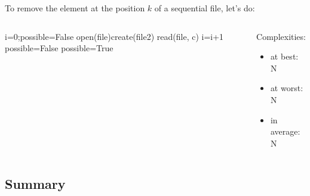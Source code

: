 \documentclass{beamer}[10pt, usepdftitle=false, handout]
\begin{document}
	\begin{frame}
	
	To remove the element at the position $k$ of a sequential file, let's do:
	
	\begin{columns}[c]
	\begin{center}    
    \scalebox{0.75} {
    \begin{algorithm}[H]
    i=0;possible=False\;
    open(file)\;create(file2)\;
	 {
		 {
			read(file, c)\;
		}
		i=i+1\;		
	}
	 {
		possible=False\;
	} {
		possible=True\;
	}
	\end{algorithm}	
	}
	\end{center}	 
	\begin{center}
	Complexities: 
	\begin{itemize}
		\item {at best: N}
		\item {at worst: N}
		\item {in average: N}
	\end{itemize}		
	\end{center}
	\end{columns}		
	
	\end{frame}		
				
	\subsection{Summary}			
					
\end{document}
